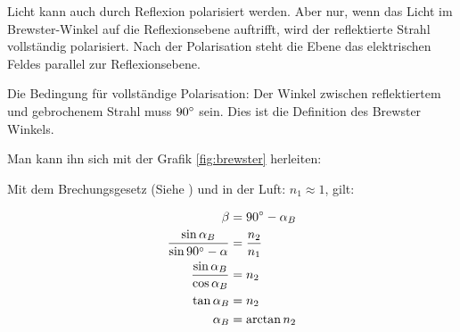 Licht kann auch durch Reflexion polarisiert werden. Aber nur, wenn das Licht im Brewster-Winkel auf die Reflexionsebene auftrifft, wird der reflektierte Strahl vollständig polarisiert. Nach der Polarisation steht die Ebene das elektrischen Feldes parallel zur Reflexionsebene.

Die Bedingung für vollständige Polarisation: Der Winkel zwischen reflektiertem und gebrochenem Strahl muss $90\degree$ sein. Dies ist die Definition des Brewster Winkels.

Man kann ihn sich mit der Grafik \ref{fig:brewster}  herleiten:

Mit dem Brechungsgesetz (Siehe ) und in der Luft: $n_1 \approx 1$, gilt:

\begin{align}
\begin{split}
	\beta &= 90\degree - \alpha_B \\
	\frac{\sin{\alpha_B}}{\sin{90\degree - \alpha}} &= \frac{n_2}{n_1} \\
	\frac{\sin{\alpha_B}}{\cos{\alpha_B}} &= n_2 \\
	\tan{\alpha_B} &= n_2 \\
	\alpha_B &= \arctan{n_2}
\end{split}
\end{align}